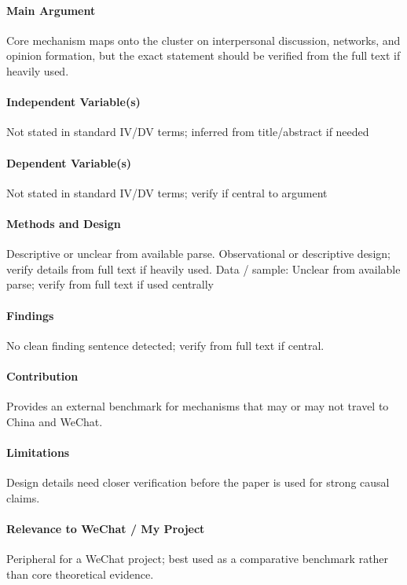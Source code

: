 \documentclass[12pt]{article}
\begin{document}
\paragraph{Main Argument} Core mechanism maps onto the cluster on interpersonal discussion, networks, and opinion formation, but the exact statement should be verified from the full text if heavily used.

\paragraph{Independent Variable(s)} Not stated in standard IV/DV terms; inferred from title/abstract if needed

\paragraph{Dependent Variable(s)} Not stated in standard IV/DV terms; verify if central to argument

\paragraph{Methods and Design} Descriptive or unclear from available parse. Observational or descriptive design; verify details from full text if heavily used. Data / sample: Unclear from available parse; verify from full text if used centrally

\paragraph{Findings} No clean finding sentence detected; verify from full text if central.

\paragraph{Contribution} Provides an external benchmark for mechanisms that may or may not travel to China and WeChat.

\paragraph{Limitations} Design details need closer verification before the paper is used for strong causal claims.

\paragraph{Relevance to WeChat / My Project} Peripheral for a WeChat project; best used as a comparative benchmark rather than core theoretical evidence.
\end{document}
